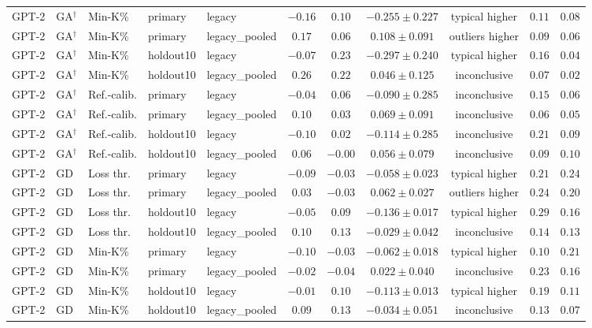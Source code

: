 {\begin{longtable}{@{\extracolsep{\fill}}lllllcccccc@{}}
GPT-2 & GA$^{\dagger}$ & Min-K\% & primary & legacy & $-0.16$ & $0.10$ & $-0.255 \pm 0.227$ & typical higher & $0.11$ & $0.08$ \\
GPT-2 & GA$^{\dagger}$ & Min-K\% & primary & legacy\_pooled & $0.17$ & $0.06$ & $0.108 \pm 0.091$ & outliers higher & $0.09$ & $0.06$ \\
GPT-2 & GA$^{\dagger}$ & Min-K\% & holdout10 & legacy & $-0.07$ & $0.23$ & $-0.297 \pm 0.240$ & typical higher & $0.16$ & $0.04$ \\
GPT-2 & GA$^{\dagger}$ & Min-K\% & holdout10 & legacy\_pooled & $0.26$ & $0.22$ & $0.046 \pm 0.125$ & inconclusive & $0.07$ & $0.02$ \\
GPT-2 & GA$^{\dagger}$ & Ref.-calib. & primary & legacy & $-0.04$ & $0.06$ & $-0.090 \pm 0.285$ & inconclusive & $0.15$ & $0.06$ \\
GPT-2 & GA$^{\dagger}$ & Ref.-calib. & primary & legacy\_pooled & $0.10$ & $0.03$ & $0.069 \pm 0.091$ & inconclusive & $0.06$ & $0.05$ \\
GPT-2 & GA$^{\dagger}$ & Ref.-calib. & holdout10 & legacy & $-0.10$ & $0.02$ & $-0.114 \pm 0.285$ & inconclusive & $0.21$ & $0.09$ \\
GPT-2 & GA$^{\dagger}$ & Ref.-calib. & holdout10 & legacy\_pooled & $0.06$ & $-0.00$ & $0.056 \pm 0.079$ & inconclusive & $0.09$ & $0.10$ \\
GPT-2 & GD & Loss thr. & primary & legacy & $-0.09$ & $-0.03$ & $-0.058 \pm 0.023$ & typical higher & $0.21$ & $0.24$ \\
GPT-2 & GD & Loss thr. & primary & legacy\_pooled & $0.03$ & $-0.03$ & $0.062 \pm 0.027$ & outliers higher & $0.24$ & $0.20$ \\
GPT-2 & GD & Loss thr. & holdout10 & legacy & $-0.05$ & $0.09$ & $-0.136 \pm 0.017$ & typical higher & $0.29$ & $0.16$ \\
GPT-2 & GD & Loss thr. & holdout10 & legacy\_pooled & $0.10$ & $0.13$ & $-0.029 \pm 0.042$ & inconclusive & $0.14$ & $0.13$ \\
GPT-2 & GD & Min-K\% & primary & legacy & $-0.10$ & $-0.03$ & $-0.062 \pm 0.018$ & typical higher & $0.10$ & $0.21$ \\
GPT-2 & GD & Min-K\% & primary & legacy\_pooled & $-0.02$ & $-0.04$ & $0.022 \pm 0.040$ & inconclusive & $0.23$ & $0.16$ \\
GPT-2 & GD & Min-K\% & holdout10 & legacy & $-0.01$ & $0.10$ & $-0.113 \pm 0.013$ & typical higher & $0.19$ & $0.11$ \\
GPT-2 & GD & Min-K\% & holdout10 & legacy\_pooled & $0.09$ & $0.13$ & $-0.034 \pm 0.051$ & inconclusive & $0.13$ & $0.07$ \\

\end{longtable}}
